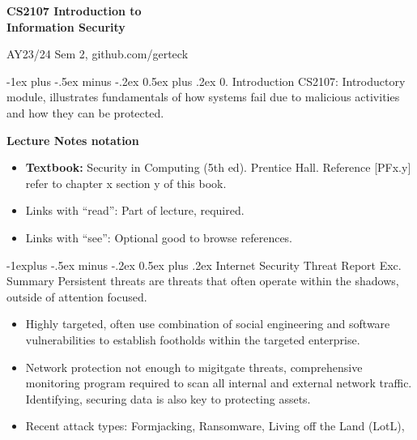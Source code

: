 \documentclass[10pt, landscape]{article}
\makeatletter
\renewcommand{\section}{\@startsection{section}{1}{0mm}%
                                {-1ex plus -.5ex minus -.2ex}%
                                {0.5ex plus .2ex}%
                                {\normalfont\large\bfseries}}
\renewcommand{\subsection}{\@startsection{subsection}{2}{0mm}%
                                {-1explus -.5ex minus -.2ex}%
                                {0.5ex plus .2ex}%
                                {\normalfont\normalsize\bfseries}}
\makeatother
\begin{document}
\raggedright
\footnotesize
\begin{multicols*}{3}

\setlength{\premulticols}{1pt}
\setlength{\postmulticols}{1pt}
\setlength{\multicolsep}{1pt}
\setlength{\columnsep}{2pt}

\begin{center}
     \Large{\textbf{CS2107 Introduction to \\
     				 Information Security}} \\
\end{center}
AY23/24 Sem 2, github.com/gerteck


\section{0. Introduction}
CS2107: Introductory module, illustrates fundamentals of how systems fail due to malicious activities and how they can be protected. 

\textbf{Lecture Notes notation}
\begin{itemize}
\item \textbf{Textbook:} Security in Computing (5th ed). Prentice Hall. Reference [PFx.y] refer to chapter x section y of this book.
\item Links with ``read'': Part of lecture, required. 
\item Links with ``see'': Optional good to browse references.
\end{itemize}

\subsection{Internet Security Threat Report Exc. Summary}
Persistent threats are threats that often operate within the shadows, outside of attention focused. 
\begin{itemize}
\item Highly targeted, often use combination of social engineering and software vulnerabilities to establish footholds within the targeted enterprise.
\item Network protection not enough to migitgate threats, comprehensive monitoring program required to scan all internal and external network traffic. Identifying, securing data is also key to protecting assets.
\item Recent attack types: Formjacking, Ransomware, Living off the Land (LotL), 
\end{itemize}



\end{multicols*}
\end{document}
